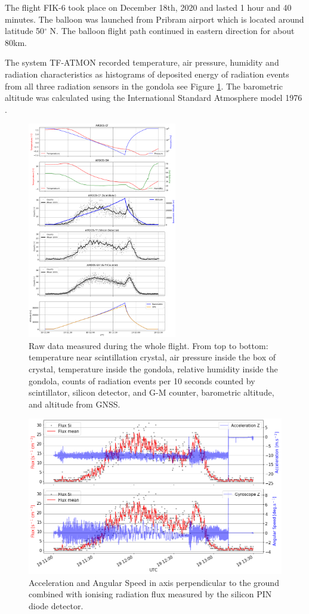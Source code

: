 \documentclass{Rpd}
\begin{document}
The flight FIK-6 took place on December 18th, 2020 and lasted 1 hour and 40 minutes. The balloon was launched from Pribram airport which is located around latitude 50$^{\circ}$ N. The balloon flight path continued in eastern direction for about 80km. 

The system TF-ATMON recorded temperature, air pressure, humidity and radiation characteristics as histograms of deposited energy of radiation events from all three radiation sensors in the gondola see Figure \ref{FIK-6_RAW_data}. The barometric altitude was calculated using the International Standard Atmosphere model 1976 \cite{standard_atmosphere}. 


\begin{figure}%
	\centerline{\includegraphics[width=65mm]{img/FIK-6_RAW_data.png}}
	\caption{Raw data measured during the whole flight. From top to bottom: temperature near scintillation crystal, air pressure inside the box of crystal, temperature inside the gondola, relative humidity inside the gondola, counts of radiation events per 10 seconds counted by scintillator, silicon detector, and  G-M counter, barometric altitude, and altitude from GNSS.\label{FIK-6_RAW_data}}
\end{figure}


\begin{figure}%
	\centerline{\includegraphics[width=\columnwidth]{img/FIK-6_metadada.png}}
	\caption{Acceleration and Angular Speed in axis perpendicular to the ground combined with ionising radiation flux measured by the silicon PIN diode detector. \label{FIK-6_telemetry}}
\end{figure}
\end{document}
